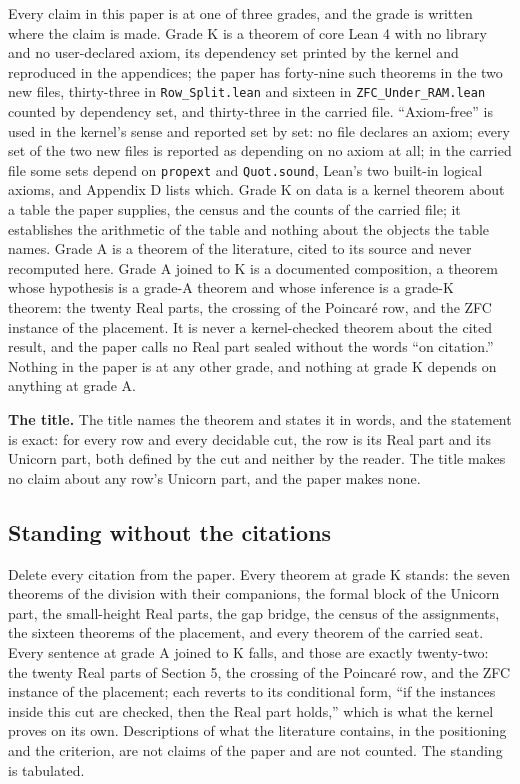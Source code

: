 \documentclass[10pt,twocolumn]{article}
\begin{document}
Every claim in this paper is at one of three grades, and the grade is
written where the claim is made. Grade K is a theorem of core Lean 4
with no library and no user-declared axiom, its dependency set printed
by the kernel and reproduced in the appendices; the paper has forty-nine
such theorems in the two new files, thirty-three in
\texttt{Row\_Split.lean} and sixteen in \texttt{ZFC\_Under\_RAM.lean}
counted by dependency set, and thirty-three in the carried file.
``Axiom-free'' is used in the kernel's sense and reported set by set: no
file declares an axiom; every set of the two new files is reported as
depending on no axiom at all; in the carried file some sets depend on
\texttt{propext} and \texttt{Quot.sound}, Lean's two built-in logical
axioms, and Appendix D lists which. Grade K on data is a kernel theorem
about a table the paper supplies, the census and the counts of the
carried file; it establishes the arithmetic of the table and nothing
about the objects the table names. Grade A is a theorem of the
literature, cited to its source and never recomputed here. Grade A
joined to K is a documented composition, a theorem whose hypothesis is a
grade-A theorem and whose inference is a grade-K theorem: the twenty
Real parts, the crossing of the Poincaré row, and the ZFC instance of
the placement. It is never a kernel-checked theorem about the cited
result, and the paper calls no Real part sealed without the words ``on
citation.'' Nothing in the paper is at any other grade, and nothing at
grade K depends on anything at grade A.

\textbf{The title.} The title names the theorem and states it in words,
and the statement is exact: for every row and every decidable cut, the
row is its Real part and its Unicorn part, both defined by the cut and
neither by the reader. The title makes no claim about any row's Unicorn
part, and the paper makes none.

\hypertarget{standing-without-the-citations}{%
\subsection{Standing without the
citations}\label{standing-without-the-citations}}

Delete every citation from the paper. Every theorem at grade K stands:
the seven theorems of the division with their companions, the formal
block of the Unicorn part, the small-height Real parts, the gap bridge,
the census of the assignments, the sixteen theorems of the placement,
and every theorem of the carried seat. Every sentence at grade A joined
to K falls, and those are exactly twenty-two: the twenty Real parts of
Section 5, the crossing of the Poincaré row, and the ZFC instance of the
placement; each reverts to its conditional form, ``if the instances
inside this cut are checked, then the Real part holds,'' which is what
the kernel proves on its own. Descriptions of what the literature
contains, in the positioning and the criterion, are not claims of the
paper and are not counted. The standing is tabulated.
\end{document}
